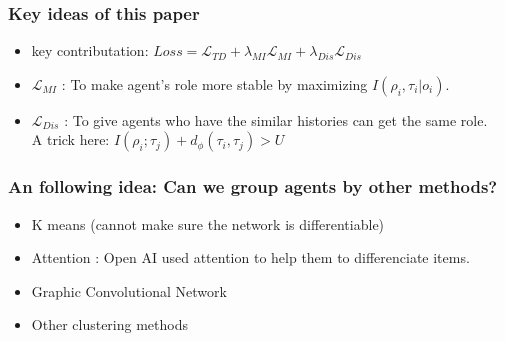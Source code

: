 \documentclass[notheorems, aspectratio=54]{beamer}
\begin{document}
\begin{frame}
\frametitle{Key ideas of this paper}
\begin{itemize}
  \item key contributation: $ Loss = \mathcal{L}_{TD} + \lambda_{MI} \mathcal{L}_{MI} + \lambda_{Dis} \mathcal{L}_{Dis}$
  \item $\mathcal{L}_{MI}$ : To make agent's role more stable by maximizing $I(\rho_i, \tau_i | o_i)$. 
  \item $\mathcal{L}_{Dis}$ : To give agents who have the similar histories can get the same role. \\
    A trick here: $I(\rho_i; \tau_j) + d_{\phi}(\tau_i, \tau_j) > U $
\end{itemize}
\end{frame}

\begin{frame}
\frametitle{An following idea: Can we group agents by other methods?}

\begin{itemize}
\item K means (cannot make sure the network is differentiable)
\item Attention : Open AI used attention to help them to differenciate items.
\item Graphic Convolutional Network
\item Other clustering methods
\end{itemize}

\end{frame}
\end{document}

